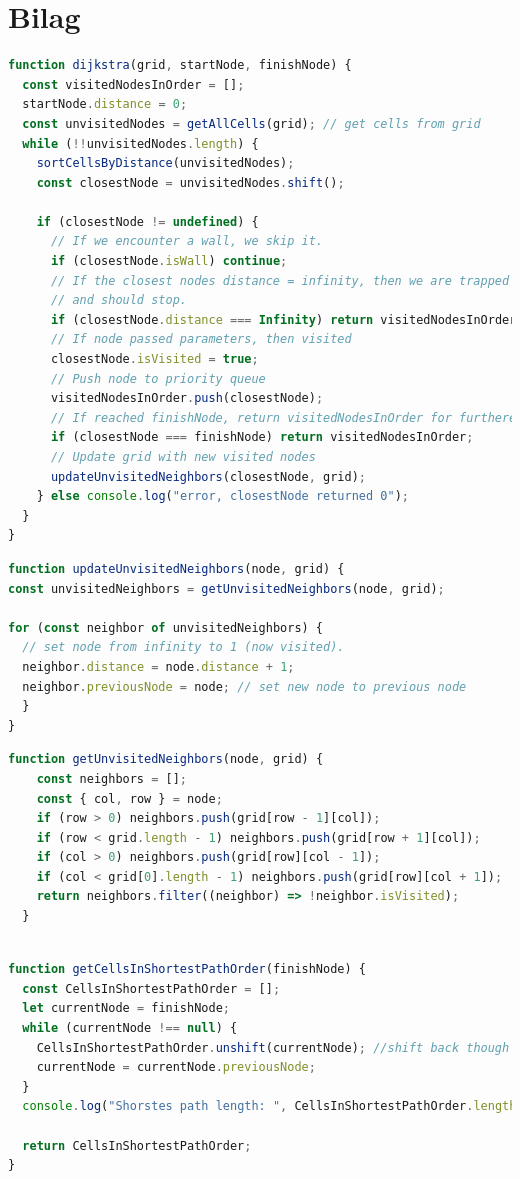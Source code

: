 \documentclass[12pt]{article}
\begin{document}
\section{Bilag}
\begin{lstlisting}[language=JavaScript, caption=Kode for Dijkstra's Algoritme]
function dijkstra(grid, startNode, finishNode) {
  const visitedNodesInOrder = [];
  startNode.distance = 0;
  const unvisitedNodes = getAllCells(grid); // get cells from grid
  while (!!unvisitedNodes.length) {
    sortCellsByDistance(unvisitedNodes);
    const closestNode = unvisitedNodes.shift();

    if (closestNode != undefined) {
      // If we encounter a wall, we skip it.
      if (closestNode.isWall) continue;
      // If the closest nodes distance = infinity, then we are trapped 
      // and should stop.
      if (closestNode.distance === Infinity) return visitedNodesInOrder;
      // If node passed parameters, then visited
      closestNode.isVisited = true; 
      // Push node to priority queue
      visitedNodesInOrder.push(closestNode);
      // If reached finishNode, return visitedNodesInOrder for furthere use.
      if (closestNode === finishNode) return visitedNodesInOrder;
      // Update grid with new visited nodes
      updateUnvisitedNeighbors(closestNode, grid); 
    } else console.log("error, closestNode returned 0");
  }
}
\end{lstlisting}
\begin{lstlisting}[language=JavaScript, caption=Kode for opdatering af unvisitedNodes]
function updateUnvisitedNeighbors(node, grid) {
const unvisitedNeighbors = getUnvisitedNeighbors(node, grid);

for (const neighbor of unvisitedNeighbors) {
  // set node from infinity to 1 (now visited).
  neighbor.distance = node.distance + 1;
  neighbor.previousNode = node; // set new node to previous node
  }
}
\end{lstlisting}
\begin{lstlisting}[language=JavaScript, caption=Kode for at søge nye nodes]
  function getUnvisitedNeighbors(node, grid) {
    const neighbors = [];
    const { col, row } = node;
    if (row > 0) neighbors.push(grid[row - 1][col]);
    if (row < grid.length - 1) neighbors.push(grid[row + 1][col]);
    if (col > 0) neighbors.push(grid[row][col - 1]);
    if (col < grid[0].length - 1) neighbors.push(grid[row][col + 1]);
    return neighbors.filter((neighbor) => !neighbor.isVisited);
  }
  
\end{lstlisting}
\begin{lstlisting}[language=JavaScript, caption=Kode for finde korteste vej]
  function getCellsInShortestPathOrder(finishNode) {
  const CellsInShortestPathOrder = [];
  let currentNode = finishNode;
  while (currentNode !== null) {
    CellsInShortestPathOrder.unshift(currentNode); //shift back though finishNode
    currentNode = currentNode.previousNode;
  }
  console.log("Shorstes path length: ", CellsInShortestPathOrder.length);

  return CellsInShortestPathOrder;
}
\end{lstlisting}
\end{document}
